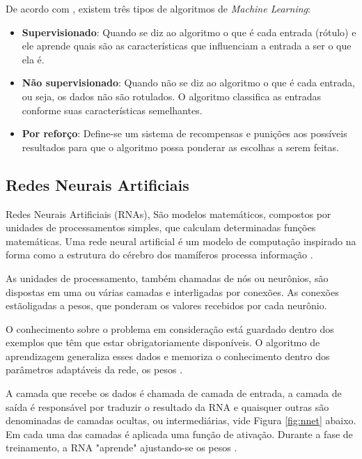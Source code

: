 \documentclass[12pt]{article}
\begin{document}
De acordo com \cite{tanaka:2018}, existem três tipos de algoritmos de 
\textit{Machine Learning}:

\begin{itemize}
  \item \textbf{Supervisionado}: Quando se diz ao algoritmo o que é cada entrada 
  (rótulo) e ele aprende quais são as características que influenciam a entrada
  a ser o que ela é.
  \item \textbf{Não supervisionado}: Quando não se diz ao algoritmo o que é cada
  entrada, ou seja, os dados não são rotulados. O algoritmo classifica as 
  entradas conforme suas características semelhantes.
  \item \textbf{Por reforço}: Define-se um sistema de recompensas e punições aos 
  possíveis resultados para que o algoritmo possa ponderar as escolhas a serem 
  feitas.
\end{itemize}

\subsection{Redes Neurais Artificiais}

Redes Neurais Artificiais (RNAs), São modelos matemáticos, compostos por 
unidades de processamentos simples, que calculam determinadas funções 
matemáticas. Uma rede neural artificial é um modelo de computação inspirado na 
forma como a estrutura do cérebro dos mamíferos processa informação 
\cite{de2003tecnicas}.

As unidades de processamento, também chamadas de nós ou neurônios, são
dispostas em uma ou várias camadas e interligadas por conexões. 
As conexões estãoligadas a pesos, que ponderam os valores recebidos por cada 
neurônio.

O conhecimento sobre o problema em consideração está guardado dentro dos
exemplos que têm que estar obrigatoriamente disponíveis. O algoritmo de
aprendizagem generaliza esses dados e memoriza o conhecimento dentro dos
parâmetros adaptáveis da rede, os pesos \cite{rauber2005redes}.

A camada que recebe os dados é chamada de camada de entrada, a camada de saída
é responsável por traduzir o resultado da RNA e quaisquer outras são denominadas 
de camadas ocultas, ou intermediárias, vide Figura \ref{fig:nnet} abaixo. 
Em cada uma das camadas é aplicada uma função de ativação. Durante a fase de 
treinamento, a RNA "aprende" ajustando-se os pesos \cite{bishop1996neural}.
\end{document}
